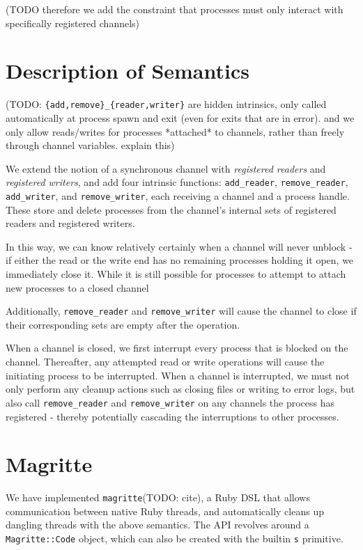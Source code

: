 \documentclass[format=sigconf, review=true, draft=true, screen=true]{acmart}
\begin{document}
(TODO therefore we add the constraint that processes must only interact with specifically registered channels)

\section{Description of Semantics}

(TODO: \verb/{add,remove}_{reader,writer}/ are hidden intrinsics, only called automatically at process spawn and exit (even for exits that are in error). and we only allow reads/writes for processes *attached* to channels, rather than freely through channel variables. explain this)

We extend the notion of a synchronous channel with \emph{registered readers} and \emph{registered writers}, and add four intrinsic functions: \verb/add_reader/, \verb/remove_reader/, \verb/add_writer/, and \verb/remove_writer/, each receiving a channel and a process handle.
These store and delete processes from the channel's internal sets of registered readers and registered writers.

In this way, we can know relatively certainly when a channel will never unblock - if either the read or the write end has no remaining processes holding it open, we immediately close it. While it is still possible for processes to attempt to attach new processes to a closed channel

Additionally, \verb/remove_reader/ and \verb/remove_writer/ will cause the channel to close if their corresponding sets are empty after the operation.

When a channel is closed, we first interrupt every process that is blocked on the channel.
Thereafter, any attempted read or write operations will cause the initiating process to be interrupted.
When a channel is interrupted, we must not only perform any cleanup actions such as closing files or writing to error logs, but also call \verb/remove_reader/ and \verb/remove_writer/ on any channels the process has registered - thereby potentially cascading the interruptions to other processes.


\section{Magritte}

We have implemented \verb/magritte/(TODO: cite), a Ruby DSL that allows communication between native Ruby threads, and automatically cleans up dangling threads with the above semantics.
The API revolves around a \verb/Magritte::Code/ object, which can also be created with the builtin \verb/s/ primitive.
\end{document}
